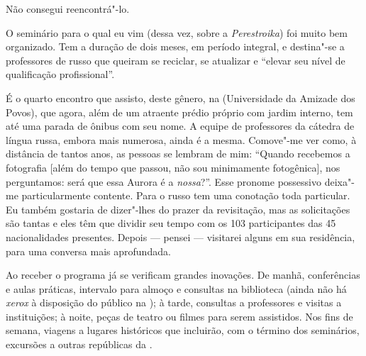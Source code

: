 Não consegui reencontrá"-lo.

O seminário para o qual eu vim (dessa vez, sobre a \emph{Perestroika}) foi muito bem organizado. Tem a duração de dois meses, em período integral, e destina"-se a professores de russo que queiram se reciclar, se atualizar e ``elevar seu nível de qualificação profissional''.

É o quarto encontro que assisto, deste gênero, na  (Universidade da Amizade dos Povos), que agora, além de um atraente prédio próprio com jardim interno, tem até uma parada de ônibus com seu nome. A equipe de professores da cátedra de língua russa, embora mais numerosa, ainda é a mesma. Comove"-me ver como, à distância de tantos anos, as pessoas se lembram de mim: ``Quando recebemos a fotografia [além do tempo que passou, não sou minimamente fotogênica], nos perguntamos: será que essa Aurora é a \emph{nossa}?''. Esse pronome possessivo deixa"-me particularmente contente. Para o russo tem uma conotação toda particular. Eu também gostaria de dizer"-lhes do prazer da revisitação, mas as solicitações são tantas e eles têm que dividir seu tempo com os 103 participantes das 45 nacionalidades presentes. Depois --- pensei --- visitarei alguns em sua residência, para uma conversa mais aprofundada.

Ao receber o programa já se verificam grandes inovações. De manhã, conferências e aulas práticas, intervalo para almoço e consultas na biblioteca (ainda não há \emph{xerox} à disposição do público na ); à tarde, consultas a professores e visitas a instituições; à noite, peças de teatro ou filmes para serem assistidos. Nos fins de semana, viagens a lugares históricos que incluirão, com o término dos seminários, excursões a outras repúblicas da .

